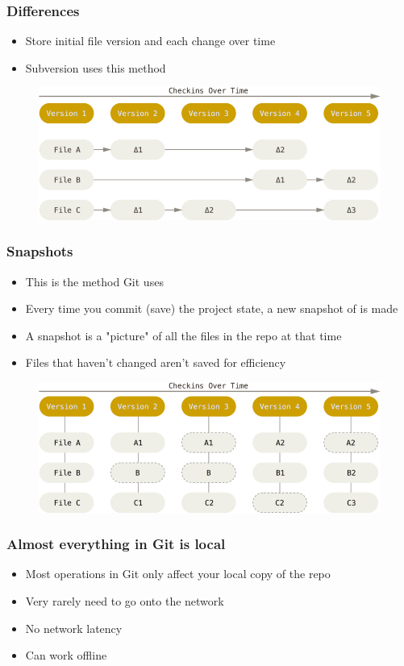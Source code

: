 \documentclass{beamer}
\begin{document}
\begin{frame}
	\frametitle{Differences}
	\begin{itemize}
		\item{Store initial file version and each change over time}
		\item{Subversion uses this method}
	\end{itemize}
	\begin{figure}
		\includegraphics[scale=0.3]{Differences-0.png}
	\end{figure}
\end{frame}

\begin{frame}
	\frametitle{Snapshots}
	\begin{itemize}
		\item{This is the method Git uses}
		\item{Every time you commit (save) the project state, a new snapshot of is made}
		\item{A snapshot is a "picture" of all the files in the repo at that time}
		\item{Files that haven't changed aren't saved for efficiency}
	\end{itemize}
	\begin{figure}
		\includegraphics[scale=0.3]{Snapshots-0.png}
	\end{figure}
\end{frame}

\begin{frame}
	\frametitle{Almost everything in Git is local}
	\begin{itemize}
		\item{Most operations in Git only affect your local copy of the repo}
		\item{Very rarely need to go onto the network}
		\item{No network latency}
		\item{Can work offline}
	\end{itemize}
\end{frame}
\end{document}
